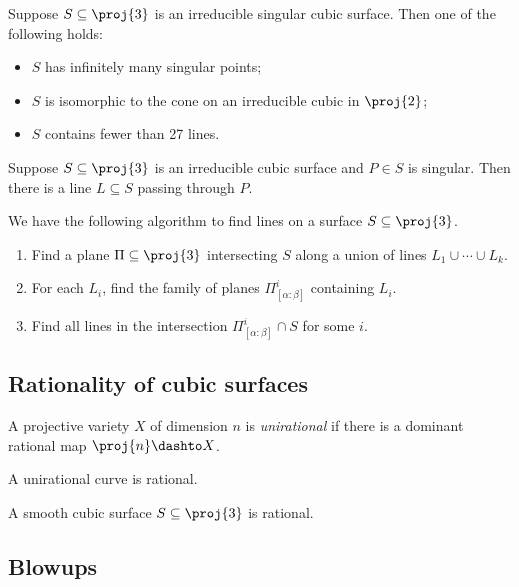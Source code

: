 \documentclass{article}
\begin{document}
\begin{theorem}
  Suppose $S\subseteq\proj{3}$ is an irreducible singular cubic surface. Then one of
  the following holds:
  \begin{itemize}
    \item $S$ has infinitely many singular points;
    \item $S$ is isomorphic to the cone on an irreducible cubic in $\proj{2}$;
    \item $S$ contains fewer than 27 lines.
  \end{itemize}
\end{theorem}

\begin{proposition}
  Suppose $S\subseteq\proj{3}$ is an irreducible cubic surface and $P\in S$ is singular. Then
  there is a line $L\subseteq S$ passing through $P$.
\end{proposition}

We have the following algorithm to find lines on a surface $S\subseteq\proj{3}$.
\begin{enumerate}
  \item Find a plane $\Pi\subseteq\proj{3}$ intersecting $S$ along a union of lines
    $L_1\cup\cdots\cup L_k$.
  \item For each $L_i$, find the family of planes $\Pi^i_{[\alpha:\beta]}$ containing
    $L_i$.
  \item Find all lines in the intersection $\Pi^i_{[\alpha:\beta]}\cap S$ for some $i$.
\end{enumerate}

\subsection{Rationality of cubic surfaces}

\begin{definition}
  A projective variety $X$ of dimension $n$ is \emph{unirational} if there is a dominant
  rational map $\proj{n}\dashto X$.
\end{definition}

\begin{theorem}[L\"uroth]
  A unirational curve is rational.
\end{theorem}

\begin{theorem}
  A smooth cubic surface $S\subseteq\proj{3}$ is rational.
\end{theorem}

\subsection{Blowups}
\end{document}
